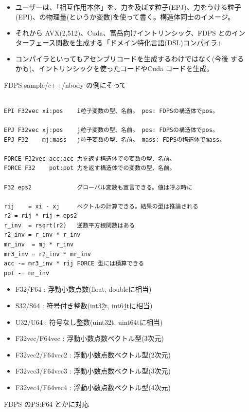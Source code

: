 \documentclass[12pt,dvipdfmx]{article}
\begin{document}

\begin{itemize}

\item ユーザーは、「相互作用本体」を、力を及ぼす粒子(EPJ)、力をうける粒子(EPI)、の物理量(というか変数)を使って書く。構造体同士のイメージ。

\item それから AVX(2,512)、Cuda、富岳向けイントリンシック、FDPS とのインターフェース関数を生成する「ドメイン特化言語(DSL)コンパイラ」

\item コンパイラといってもアセンブリコードを生成するわけではなく(今後
するかも)、イントリンシックを使ったコードやCuda コードを生成。

\end{itemize}


FDPS sample/c++/nbody の例にそって
{\normalsize
\begin{verbatim}

EPI F32vec xi:pos    i粒子変数の型、名前。 pos: FDPSの構造体でpos。

EPJ F32vec xj:pos    j粒子変数の型、名前。 pos: FDPSの構造体でpos。
EPJ F32    mj:mass   j粒子変数の型、名前。 mass: FDPSの構造体でmass。

FORCE F32vec acc:acc 力を返す構造体での変数の型、名前。
FORCE F32    pot:pot 力を返す構造体での変数の型、名前。

F32 eps2             グローバル変数も宣言できる。値は呼ぶ時に

rij    = xi - xj     ベクトルの計算できる。結果の型は推論される
r2 = rij * rij + eps2  
r_inv  = rsqrt(r2)   逆数平方根関数はある
r2_inv = r_inv * r_inv
mr_inv  = mj * r_inv
mr3_inv = r2_inv * mr_inv
acc -= mr3_inv * rij FORCE 型には積算できる
pot -= mr_inv
\end{verbatim}
}



\begin{itemize}
\item F32/F64 : 浮動小数点数(float, doubleに相当)
\item S32/S64 : 符号付き整数(int32̲t, int64̲tに相当)
\item U32/U64 : 符号なし整数(uint32̲t, uint64̲tに相当)
\item F32vec/F64vec : 浮動小数点数ベクトル型(3次元)
\item F32vec2/F64vec2 : 浮動小数点数ベクトル型(2次元)
\item F32vec3/F64vec3 : 浮動小数点数ベクトル型(3次元)
\item F32vec4/F64vec4 : 浮動小数点数ベクトル型(4次元)
\end{itemize}
FDPS のPS:F64 とかに対応
\end{document}

